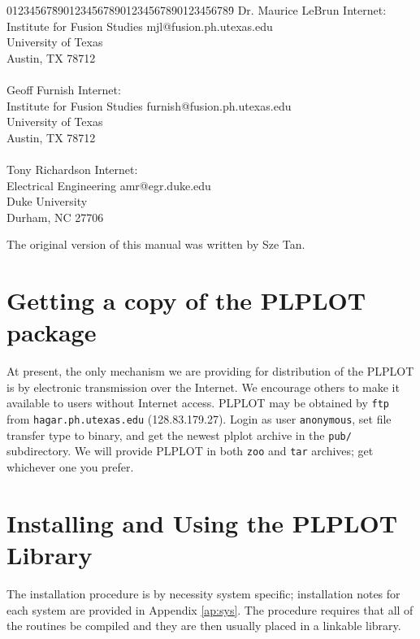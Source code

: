 \begin{tabbing}
01234567\=
	89012345678901234567890123456789\= \kill
%
	\>Dr. Maurice LeBrun		\>Internet:\\
	\>Institute for Fusion Studies	\>mjl@fusion.ph.utexas.edu\\
	\>University of Texas\\
	\>Austin, TX  78712\\
\\
	\>Geoff Furnish			\>Internet:\\
	\>Institute for Fusion Studies	\>furnish@fusion.ph.utexas.edu\\
	\>University of Texas\\
	\>Austin, TX  78712\\
\\
	\>Tony Richardson		\>Internet:\\
	 Electrical Engineering	\>amr@egr.duke.edu\\
	\>Duke University\\
	\>Durham, NC 27706\\
\end{tabbing}

The original version of this manual was written by Sze Tan.

\section {Getting a copy of the PLPLOT package}

At present, the only mechanism we are providing for distribution of the
PLPLOT is by electronic transmission over the Internet.  We encourage
others to make it available to users without Internet access.  PLPLOT may
be obtained by {\tt ftp} from {\tt hagar.ph.utexas.edu} (128.83.179.27).
Login as user {\tt anonymous}, set file transfer type to binary, and get
the newest plplot archive in the {\tt pub/} subdirectory.  We will provide
PLPLOT in both {\tt zoo} and {\tt tar} archives; get whichever one you
prefer. 

\section {Installing and Using the PLPLOT Library}

The installation procedure is by necessity system specific; installation
notes for each system are provided in Appendix \ref{ap:sys}.  The procedure
requires that all of the routines be compiled and they are then usually
placed in a linkable library. 


